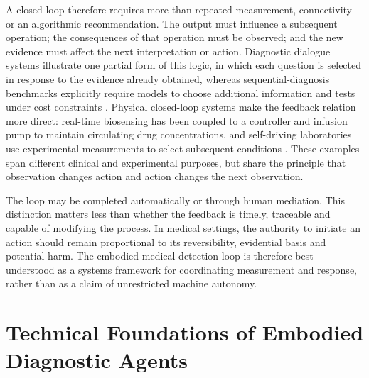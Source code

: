 \documentclass[12pt,a4paper]{article}
\begin{document}
A closed loop therefore requires more than repeated measurement,
connectivity or an algorithmic recommendation. The output must influence a
subsequent operation; the consequences of that operation must be observed;
and the new evidence must affect the next interpretation or action.
Diagnostic dialogue systems illustrate one partial form of this logic, in
which each question is selected in response to the evidence already
obtained, whereas sequential-diagnosis benchmarks explicitly require models
to choose additional information and tests under cost constraints
\cite{Tu2025ConversationalDiagnosticAI,Nori2025SequentialDiagnosis}.
Physical closed-loop systems make the feedback relation more direct:
real-time biosensing has been coupled to a controller and infusion pump to
maintain circulating drug concentrations, and self-driving laboratories use
experimental measurements to select subsequent conditions
\cite{Mage2017ClosedLoopDrugControl,Rapp2024SelfDrivingProtein}. These
examples span different clinical and experimental purposes, but share the
principle that observation changes action and action changes the next
observation.


The loop may be completed automatically or through human mediation. This
distinction matters less than whether the feedback is timely, traceable and
capable of modifying the process. In medical settings, the authority to
initiate an action should remain proportional to its reversibility,
evidential basis and potential harm. The embodied medical detection loop is
therefore best understood as a systems framework for coordinating
measurement and response, rather than as a claim of unrestricted machine
autonomy.


\section{Technical Foundations of Embodied Diagnostic Agents}
\label{sec:technical_enablers}


\end{document}
